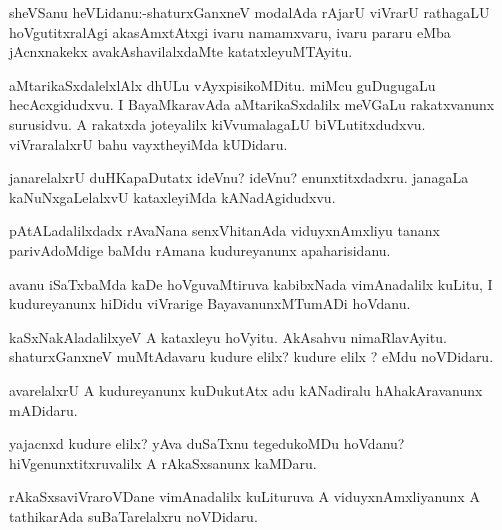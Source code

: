 \documentclass{article}
\begin{document}

\begin{mn}%
sheVSanu heVLidanu:-shaturxGanxneV modalAda rAjarU viVrarU rathagaLU hoVgutitxralAgi 
akasAmxtAtxgi ivaru namamxvaru, ivaru pararu eMba jAcnxnakekx avakAshavilalxdaMte 
katatxleyuMTAyitu.
\end{mn}

\begin{mn}%
aMtarikaSxdalelxlAlx dhULu vAyxpisikoMDitu. miMcu guDugugaLu hecAcxgidudxvu. I BayaMkaravAda
aMtarikaSxdalilx meVGaLu rakatxvanunx surusidvu. A rakatxda joteyalilx kiVvumalagaLU 
biVLutitxdudxvu. viVraralalxrU bahu vayxtheyiMda kUDidaru.
\end{mn}

\begin{mn}%
janarelalxrU duHKapaDutatx ideVnu? ideVnu? enunxtitxdadxru. janagaLa kaNuNxgaLelalxvU 
kataxleyiMda kANadAgidudxvu.
\end{mn}

\begin{mn}%
pAtALadalilxdadx rAvaNana senxVhitanAda viduyxnAmxliyu tananx parivAdoMdige baMdu rAmana
kudureyanunx apaharisidanu.
\end{mn}

\begin{mn}%
avanu iSaTxbaMda kaDe hoVguvaMtiruva kabibxNada vimAnadalilx kuLitu, I kudureyanunx hiDidu 
viVrarige BayavanunxMTumADi hoVdanu. 
\end{mn}

\begin{mn}%
kaSxNakAladalilxyeV A kataxleyu hoVyitu. AkAsahvu nimaRlavAyitu. shaturxGanxneV 
muMtAdavaru kudure elilx? kudure elilx ? eMdu noVDidaru.
\end{mn}

\begin{mn}%
avarelalxrU A kudureyanunx kuDukutAtx adu kANadiralu hAhakAravanunx mADidaru.
\end{mn}

\begin{mn}%
yajacnxd kudure elilx? yAva duSaTxnu tegedukoMDu hoVdanu? hiVgenunxtitxruvalilx A 
rAkaSxsanunx kaMDaru.
\end{mn}

\begin{mn}%
rAkaSxsaviVraroVDane vimAnadalilx kuLituruva A viduyxnAmxliyanunx A tathikarAda 
suBaTarelalxru noVDidaru.
\end{mn}
\end{document}
